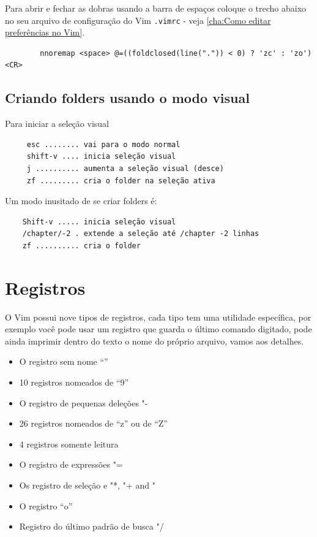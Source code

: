 \documentclass[10pt,a4paper,openany]{book}
\begin{document}
Para abrir e fechar as dobras usando a barra de
espaços coloque o trecho abaixo no seu arquivo de configuração do Vim
\verb|.vimrc| - veja \ref{cha:Como editar preferências no Vim}.

\begin{verbatim}
		nnoremap <space> @=((foldclosed(line(".")) < 0) ? 'zc' : 'zo')<CR>
\end{verbatim}

\section{Criando folders usando o modo visual}
\label{Criando folders usando o modo visual}
Para iniciar a seleção visual

\begin{verbatim}
	 esc ........ vai para o modo normal
	 shift-v .... inicia seleção visual
	 j .......... aumenta a seleção visual (desce)
	 zf ......... cria o folder na seleção ativa
\end{verbatim}

Um modo inusitado de se criar folders é:

\begin{verbatim}
	Shift-v ..... inicia seleção visual
	/chapter/-2 . extende a seleção até /chapter -2 linhas
	zf .......... cria o folder
\end{verbatim}

\chapter{Registros}
\label{Registros}

O Vim possui nove tipos de registros, cada tipo tem uma utilidade
específica, por exemplo você pode usar um registro que guarda o último
comando digitado, pode ainda imprimir dentro do texto o nome do
próprio arquivo, vamos aos detalhes.

\begin{itemize}
	\item O registro sem nome ``''
	\item 10 registros nomeados de ``9''
	\item O registro de pequenas deleções "-
	\item 26 registros nomeados de ``z'' ou de ``Z''
	\item 4 registros somente leitura
	\item O registro de expressões "=
	\item Os registro de seleção e  "*, "+ and "~
	\item O registro ``o''
	\item Registro do último padrão de busca "/
\end{itemize}
\end{document}
